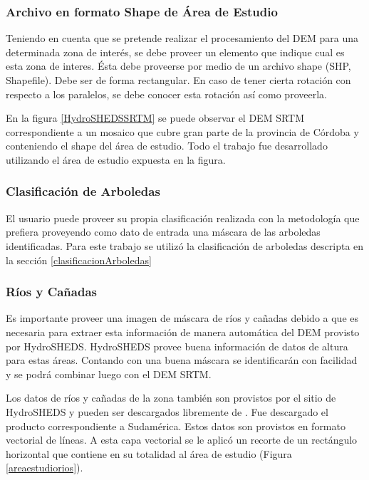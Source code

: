 \documentclass[10pt,a4paper, twoside]{report}
\begin{document}
\subsubsection{Archivo en formato Shape de Área de Estudio}

Teniendo en cuenta que se pretende realizar el procesamiento del DEM para una determinada zona de interés, se debe proveer un elemento que indique cual es esta zona de interes. Ésta debe proveerse por medio de un archivo shape (SHP, Shapefile). Debe ser de forma rectangular. En caso de tener cierta rotación con respecto a los paralelos, se debe conocer esta rotación así como proveerla. 

En la figura \ref{HydroSHEDSSRTM} se puede observar el DEM SRTM correspondiente a un mosaico que cubre gran parte de la provincia de Córdoba y conteniendo el shape del área de estudio. Todo el trabajo fue desarrollado utilizando el área de estudio expuesta en la figura.




\subsubsection{Clasificación de Arboledas}

El usuario puede proveer su propia clasificación realizada con la metodología que prefiera proveyendo como dato de entrada una máscara de las arboledas identificadas. Para este trabajo se utilizó la clasificación de arboledas descripta en la sección \ref{clasificacionArboledas}


\subsubsection{Ríos y Cañadas}
\label{vectorRiosArea}

Es importante proveer una imagen de máscara de ríos y cañadas debido a que es necesaria para extraer esta información de manera automática del DEM provisto por HydroSHEDS. HydroSHEDS provee buena información de datos de altura para estas áreas. Contando con una buena máscara se identificarán con facilidad y se podrá combinar luego con el DEM SRTM.

Los datos de ríos y cañadas de la zona también son provistos por el sitio de HydroSHEDS y pueden ser descargados libremente de \cite{hydroShedsSite}. Fue descargado el producto correspondiente a Sudamérica. Estos datos son provistos en formato vectorial de líneas. A esta capa vectorial se le aplicó un recorte de un rectángulo horizontal que contiene en su totalidad al área de estudio (Figura \ref{areaestudiorios}).
\end{document}
